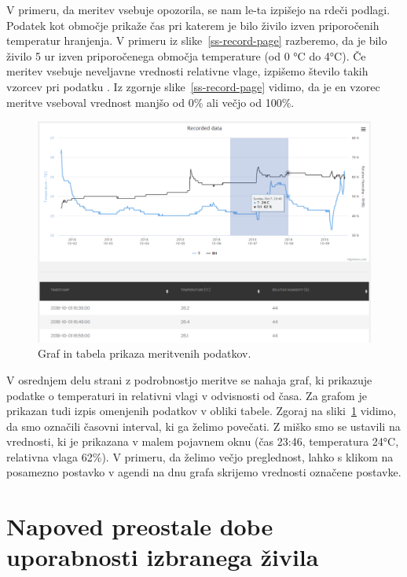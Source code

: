 \documentclass[a4paper, 12pt]{book}
\begin{document}
V primeru, da meritev vsebuje opozorila, se nam le-ta izpišejo na rdeči podlagi. Podatek  kot območje prikaže čas pri katerem je bilo živilo izven priporočenih temperatur hranjenja. V primeru iz slike~\ref{ss-record-page} razberemo, da je bilo živilo 5 ur izven priporočenega območja temperature (od 0 °C do 4°C). 
Če meritev vsebuje neveljavne vrednosti relativne vlage, izpišemo število takih vzorcev pri podatku . Iz zgornje slike~\ref{ss-record-page} vidimo, da je en vzorec meritve vseboval vrednost manjšo od 0\% ali večjo od 100\%.


\begin{figure}[h]
\begin{center}
\includegraphics[width=\textwidth]{slike/record_page_2_zoom.png}
\end{center}
\caption{Graf in tabela prikaza meritvenih podatkov.}
\label{ss-record-page-zoom}
\end{figure}

V osrednjem delu strani z podrobnostjo meritve se nahaja graf, ki prikazuje podatke o temperaturi in relativni vlagi v odvisnosti od časa. Za grafom je prikazan tudi izpis omenjenih podatkov v obliki tabele.
Zgoraj na sliki~\ref{ss-record-page-zoom} vidimo, da smo označili časovni interval, ki ga želimo povečati. Z miško smo se ustavili na vrednosti, ki je prikazana v malem pojavnem oknu (čas 23:46, temperatura 24°C, relativna vlaga 62\%). V primeru, da želimo večjo preglednost, lahko s klikom na posamezno postavko v agendi na dnu grafa skrijemo vrednosti označene postavke.  


\section{Napoved preostale dobe uporabnosti izbranega živila}
\end{document}
